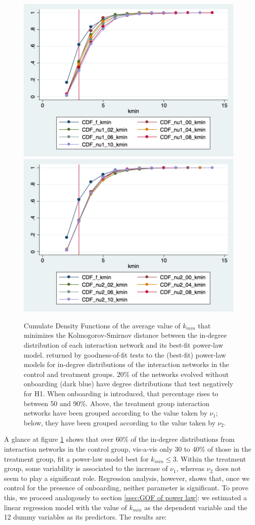\documentclass{nws}
\begin{document}
\begin{figure}[thb]
\centering

	\includegraphics[width=.75\linewidth]{./Pictures/CDF_kmin_nu1.png}
	\includegraphics[width=.75\linewidth]{./Pictures/CDF_kmin_nu2.png}
  \caption{Cumulate Density Functions of the average value of $k_{min}$ that minimizes the Kolmogorov-Smirnov distance between the in-degree distribution of each interaction network and its best-fit power-law model.  returned by goodness-of-fit tests to the (best-fit) power-law models for in-degree distributions of the interaction networks in the control and treatment groups. 20\% of the networks evolved without onboarding (dark blue) have degree distributions that test negatively for H1. When onboarding is introduced, that percentage rises to between 50 and 90\%. Above, the treatment group interaction networks have been grouped according to the value taken by $\nu_1$; below, they have been grouped according to the value taken by $\nu_2$.} 
 \label{fig:CDFkmin_nu_1nu_2}
\end{figure}



A glance at figure \ref{fig:CDFkmin_nu_1nu_2} shows that over 60\% of the in-degree distributions from interaction networks in the control group, vis-a-vis only 30 to 40\% of those in the treatment group, fit a power-law model best for $k_{min} \leq 3$. Within the treatment group, some variability is associated to the increase of $\nu_1$, whereas $\nu_2$ does not seem to play a significant role. Regression analysis, however, shows that, once we control for the presence of onboarding, neither parameter is significant. To prove this, we proceed analogously to section \ref{ssec:GOF of power law}: we estimated a linear regression model with the value of $k_{min}$ as the dependent variable and the 12 dummy variables as its predictors. The results are:
\end{document}
